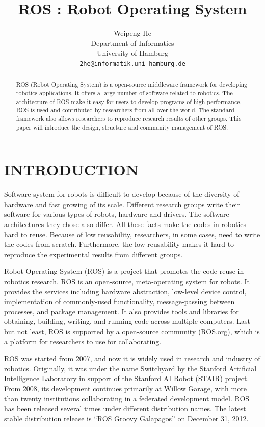 \documentclass[a4paper, 10pt, conference]{ieeeconf}       %
\title{\LARGE \bf
  ROS : Robot Operating System
}
\author{
  Weipeng He
\\ Department of Informatics\\ University of Hamburg \\ {\tt\small 2he@informatik.uni-hamburg.de}
}
\begin{document}
\maketitle
\thispagestyle{empty}
\pagestyle{empty}

\begin{abstract}
  ROS (Robot Operating System) is a open-source middleware framework for developing robotics applications. It offers a large number of software related to robotics. The architecture of ROS make it easy for users to develop programs of high performance. ROS is used and contributed by researchers from all over the world. The standard framework also allows researchers to reproduce research results of other groups. This paper will introduce the design, structure and community management of ROS.
\end{abstract}


\section{INTRODUCTION}

Software system for robots is difficult to develop because of the diversity of hardware and fast growing of its scale. Different research groups write their software for various types of robots, hardware and drivers. The software architectures they chose also differ. All these facts make the codes in robotics hard to reuse. Because of low reusability, researchers, in some cases, need to write the codes from scratch. Furthermore, the low reusability makes it hard to reproduce the experimental results from different groups.

Robot Operating System (ROS) is a project that promotes the code reuse in robotics research\cite{quigley_ros:_2009}. ROS is an open-source, meta-operating system for robots. It provides the services including hardware abstraction, low-level device control, implementation of commonly-used functionality, message-passing between processes, and package management. It also provides tools and libraries for obtaining, building, writing, and running code across multiple computers. Last but not least, ROS is supported by a open-source community (ROS.org), which is a platform for researchers to use for collaborating.

ROS was started from 2007, and now it is widely used in research and industry of robotics. Originally, it was under the name Switchyard by the Stanford Artificial Intelligence Laboratory in support of the Stanford AI Robot (STAIR) project. From 2008, its development continues primarily at Willow Garage, with more than twenty institutions collaborating in a federated development model. ROS has been released several times under different distribution names. The latest stable distribution release is ``ROS Groovy Galapagos'' on December 31, 2012\cite{_documentation_2013}.
\end{document}

